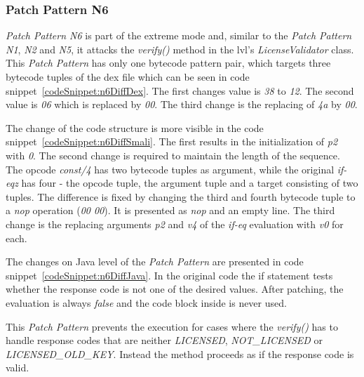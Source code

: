 \subsubsection{Patch Pattern N6}
 \textit{Patch Pattern N6} is part of the extreme mode and, similar to the \textit{Patch Pattern N1}, \textit{N2} and \textit{N5}, it attacks the \textit{verify()} method in the \gls{lvl}'s \textit{LicenseValidator} class.
\newline
This \textit{Patch Pattern} has only one bytecode pattern pair, which targets three bytecode tuples of the \gls{dex} file which can be seen in code snippet~\ref{codeSnippet:n6DiffDex}.
The first changes value is \textit{38} to \textit{12}.
The second value is \textit{06} which is replaced by \textit{00}.
The third change is the replacing of \textit{4a} by \textit{00}.
\newline

The change of the code structure is more visible in the code snippet~\ref{codeSnippet:n6DiffSmali}.
The first results in the initialization of \textit{p2} with \textit{0}.
The second change is required to maintain the length of the sequence.
The opcode \textit{const/4} has two bytecode tuples as argument, while the original \textit{if-eqz} has four - the opcode tuple, the argument tuple and a target consisting of two tuples.
The difference is fixed by changing the third and fourth bytecode tuple to a \textit{nop} operation (\textit{00 00}).
It is presented as \textit{nop} and an empty line.
The third change is the replacing arguments \textit{p2} and \textit{v4} of the \textit{if-eq} evaluation with \textit{v0} for each.
\newline

The changes on Java level of the \textit{Patch Pattern} are presented in code snippet~\ref{codeSnippet:n6DiffJava}.
In the original code the if statement tests whether the response code is not one of the desired values.
After patching, the evaluation is always \textit{false} and the code block inside is never used.
\newline

This \textit{Patch Pattern} prevents the execution for cases where the \textit{verify()} has to handle response codes that are neither \textit{LICENSED}, \textit{NOT\_LICENSED} or \textit{LICENSED\_OLD\_KEY}.
Instead the method proceeds as if the response code is valid.


